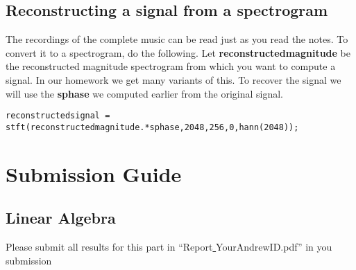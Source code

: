 \subsection{Reconstructing a signal from a spectrogram}

The recordings of the complete music can be read just as you read the notes. To convert it to a spectrogram, do the following. Let \textbf{reconstructedmagnitude} be the reconstructed magnitude spectrogram from which you want to compute a signal. In our homework we get many variants of this. To recover the signal we will use the \textbf{sphase} we computed earlier from the original signal.
\begin{lstlisting}
reconstructedsignal = stft(reconstructedmagnitude.*sphase,2048,256,0,hann(2048));
\end{lstlisting}





\newpage
\section{Submission Guide}

\subsection{Linear Algebra}
Please submit all results for this part in ``Report\underline{ }YourAndrewID.pdf'' in you submission
